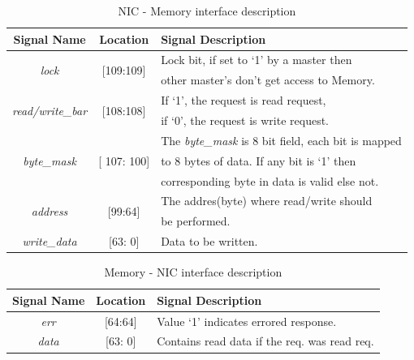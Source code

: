 \documentclass[12pt]{report}
\begin{document}
				\begin{table}[!htbp]
					\centering
					\begin{tabular}{ccl}
						\hline
						\textbf{Signal Name} 			& \textbf{Location} 		&\textbf{Signal Description}  \\ \hline
						\multirow{2}{*}{\textit{lock}}		& \multirow{2}{*}{[109:109]}	& Lock bit, if set to `1' by a master then\\
											&				& other master's don't get access to Memory.\\ \hline
						\multirow{2}{*}{\textit{read/write\_bar}}& \multirow{2}{*}{[108:108]}	& If `1', the request is read request,\\ 
											& 				& if `0', the request is write request.\\ \hline
						\multirow{3}{*}{\textit{byte\_mask}}	& \multirow{3}{*}{[ 107: 100]}	& The \textit{byte\_mask} is 8 bit field, each bit is mapped\\
											&				& to 8 bytes of data. If any bit is `1' then\\
											& 				& corresponding byte in data is valid else not.\\ \hline 
						\multirow{2}{*}{\textit{address}}   	& \multirow{2}{*}{[99:64]} 	& The addres(byte) where read/write should\\ 
											&				& be performed.\\ \hline
						\textit{write\_data}   			& [63: 0] 			& Data to be written.\\ \hline
					\end{tabular}
					\caption{NIC - Memory interface description}
					\label{tab:NIC-Memory-interface-req}
				\end{table}

				\begin{table}[!htbp]
					\centering
					\begin{tabular}{ccl}
						\hline
						\textbf{Signal Name} 		& \textbf{Location} 		&\textbf{Signal Description}  \\ \hline
						\textit{err}			& [64:64]			& Value `1' indicates errored response.\\\hline
						\textit{data}   		& [63: 0] 			& Contains read data if the req. was read req.\\ \hline
					\end{tabular}
					\caption{Memory - NIC interface description}
					\label{tab:Memory-NIC-interface-resp}
				\end{table}
			
\end{document}
